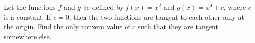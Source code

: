 Let the functions $f$ and $g$ be defined by $f(x)=x^2$ and $g(x)=x^4+c$, where $c$ is
a constant. If $c=0$, then the two functions are tangent to each other only at the
origin. Find the only nonzero value of $c$ such that they are tangent somewhere else.
\answercheck
